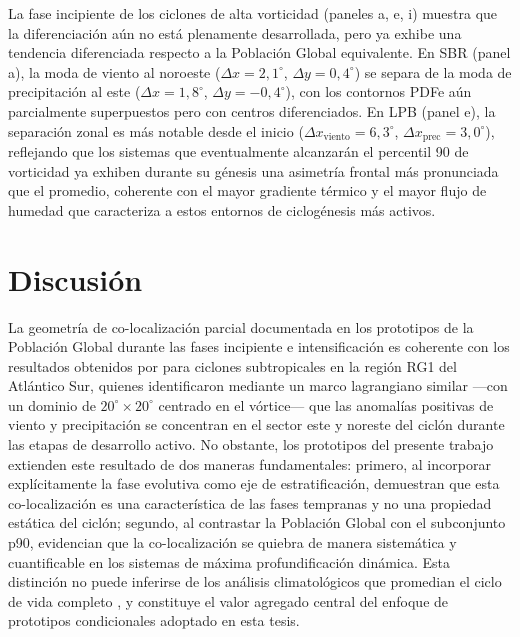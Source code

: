 La fase incipiente de los ciclones de alta vorticidad (paneles a, e, i) muestra que la diferenciación aún no está plenamente desarrollada, pero ya exhibe una tendencia diferenciada respecto a la Población Global equivalente. En SBR (panel a), la moda de viento al noroeste ($\Delta x = 2{,}1^{\circ}$, $\Delta y = 0{,}4^{\circ}$) se separa de la moda de precipitación al este ($\Delta x = 1{,}8^{\circ}$, $\Delta y = -0{,}4^{\circ}$), con los contornos PDFe aún parcialmente superpuestos pero con centros diferenciados. En LPB (panel e), la separación zonal es más notable desde el inicio ($\Delta x_{\text{viento}} = 6{,}3^{\circ}$, $\Delta x_{\text{prec}} = 3{,}0^{\circ}$), reflejando que los sistemas que eventualmente alcanzarán el percentil 90 de vorticidad ya exhiben durante su génesis una asimetría frontal más pronunciada que el promedio, coherente con el mayor gradiente térmico y el mayor flujo de humedad que caracteriza a estos entornos de ciclogénesis más activos.

\section{Discusión}\label{sec:discusion_prototipos}


La geometría de co-localización parcial documentada en los prototipos de la Población Global durante las fases incipiente e intensificación es coherente con los resultados obtenidos por \citet{cardoso2022synoptic} para ciclones subtropicales en la región RG1 del Atlántico Sur, quienes identificaron mediante un marco lagrangiano similar —con un dominio de $20^{\circ} \times 20^{\circ}$ centrado en el vórtice— que las anomalías positivas de viento y precipitación se concentran en el sector este y noreste del ciclón durante las etapas de desarrollo activo. No obstante, los prototipos del presente trabajo extienden este resultado de dos maneras fundamentales: primero, al incorporar explícitamente la fase evolutiva como eje de estratificación, demuestran que esta co-localización es una característica de las fases tempranas y no una propiedad estática del ciclón; segundo, al contrastar la Población Global con el subconjunto p90, evidencian que la co-localización se quiebra de manera sistemática y cuantificable en los sistemas de máxima profundificación dinámica. Esta distinción no puede inferirse de los análisis climatológicos que promedian el ciclo de vida completo \citep{gramcianinov2023impact}, y constituye el valor agregado central del enfoque de prototipos condicionales adoptado en esta tesis.

